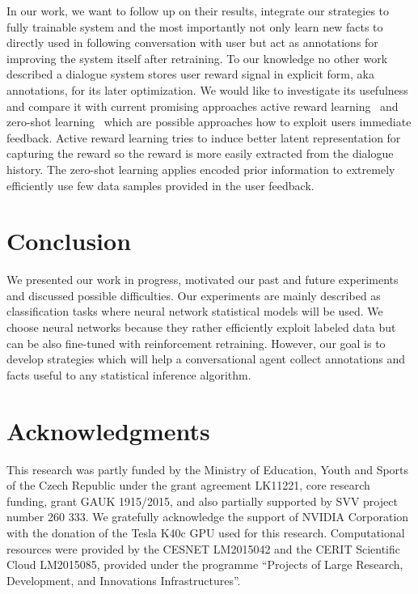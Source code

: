 \documentclass[11pt]{article}
\begin{document}
In our work, we want to follow up on their results, integrate our strategies to fully trainable system and the most importantly not only learn new facts to directly used in following conversation with user but act as annotations for improving the system itself after retraining.
To our knowledge no other work described a dialogue system stores user reward signal in explicit form, aka annotations, for its later optimization.
We would like to investigate its usefulness and compare it with current promising approaches active reward learning~\cite{su2016active} and 
zero-shot learning~\cite{vinyals_matching_2016} which are possible approaches how to exploit users immediate feedback.
Active reward learning tries to induce better latent representation for capturing the reward so the reward is more easily extracted from the dialogue history.
The zero-shot learning applies encoded prior information to extremely efficiently use few data samples provided in the user feedback.


\section{Conclusion}
\label{sec:conclusion}
We presented our work in progress, motivated our past and future experiments and discussed possible difficulties.
Our experiments are mainly described as classification tasks where neural network statistical models will be used.
We choose neural networks because they rather efficiently exploit labeled data but can be also fine-tuned with reinforcement retraining.
However, our goal is to develop strategies which will help a conversational agent collect annotations and facts useful to any statistical inference algorithm.

\section*{Acknowledgments}
This research was partly funded by the Ministry of Education, Youth and Sports of the Czech Republic under the grant agreement LK11221, core research funding, grant GAUK 1915/2015, and also partially supported by SVV project number 260 333. 
We gratefully acknowledge the support of NVIDIA Corporation with the donation of the Tesla K40c GPU used for this research.
Computational resources were provided by the CESNET LM2015042 and the CERIT Scientific Cloud LM2015085, provided under the programme ``Projects of Large Research, Development, and Innovations Infrastructures''.



\end{document}
